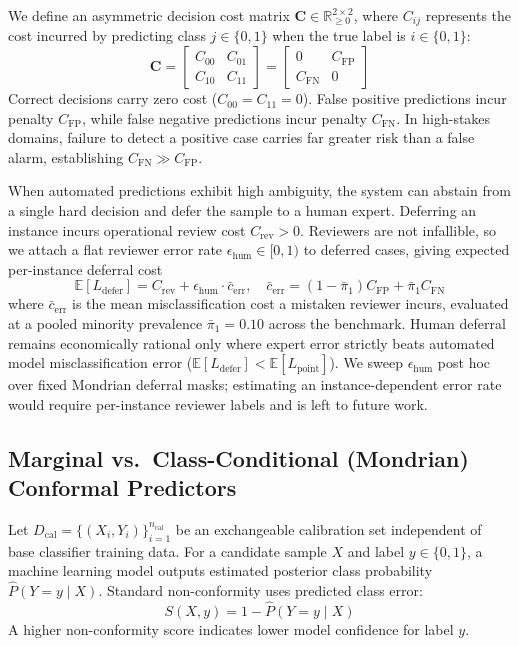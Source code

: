 \documentclass{ieeetj}
\begin{document}
We define an asymmetric decision cost matrix $\mathbf{C} \in \mathbb{R}_{\ge 0}^{2 \times 2}$, where $C_{ij}$ represents the cost incurred by predicting class $j \in \{0, 1\}$ when the true label is $i \in \{0, 1\}$:
\begin{equation}
\mathbf{C} = \begin{bmatrix} C_{00} & C_{01} \\ C_{10} & C_{11} \end{bmatrix} = \begin{bmatrix} 0 & C_{\mathrm{FP}} \\ C_{\mathrm{FN}} & 0 \end{bmatrix}
\end{equation}
Correct decisions carry zero cost ($C_{00} = C_{11} = 0$). False positive predictions incur penalty $C_{\mathrm{FP}}$, while false negative predictions incur penalty $C_{\mathrm{FN}}$. In high-stakes domains, failure to detect a positive case carries far greater risk than a false alarm, establishing $C_{\mathrm{FN}} \gg C_{\mathrm{FP}}$.

When automated predictions exhibit high ambiguity, the system can abstain from a single hard decision and defer the sample to a human expert. Deferring an instance incurs operational review cost $C_{\mathrm{rev}} > 0$. Reviewers are not infallible, so we attach a flat reviewer error rate $\epsilon_{\mathrm{hum}} \in [0,1)$ to deferred cases, giving expected per-instance deferral cost
\begin{equation}
\mathbb{E}[L_{\mathrm{defer}}] = C_{\mathrm{rev}} + \epsilon_{\mathrm{hum}} \cdot \bar{c}_{\mathrm{err}}, \quad \bar{c}_{\mathrm{err}} = (1-\bar{\pi}_1) C_{\mathrm{FP}} + \bar{\pi}_1 C_{\mathrm{FN}}
\end{equation}
where $\bar{c}_{\mathrm{err}}$ is the mean misclassification cost a mistaken reviewer incurs, evaluated at a pooled minority prevalence $\bar{\pi}_1 = 0.10$ across the benchmark. Human deferral remains economically rational only where expert error strictly beats automated model misclassification error ($\mathbb{E}[L_{\mathrm{defer}}] < \mathbb{E}[L_{\mathrm{point}}]$). We sweep $\epsilon_{\mathrm{hum}}$ post hoc over fixed Mondrian deferral masks; estimating an instance-dependent error rate would require per-instance reviewer labels and is left to future work.

\subsection{Marginal vs.\ Class-Conditional (Mondrian) Conformal Predictors}
Let $D_{\mathrm{cal}} = \{(X_i, Y_i)\}_{i=1}^{n_{\mathrm{cal}}}$ be an exchangeable calibration set independent of base classifier training data. For a candidate sample $X$ and label $y \in \{0, 1\}$, a machine learning model outputs estimated posterior class probability $\hat{P}(Y=y \mid X)$. Standard non-conformity uses predicted class error:
\begin{equation}
S(X, y) = 1 - \hat{P}(Y=y \mid X)
\end{equation}
A higher non-conformity score indicates lower model confidence for label $y$.
\end{document}
